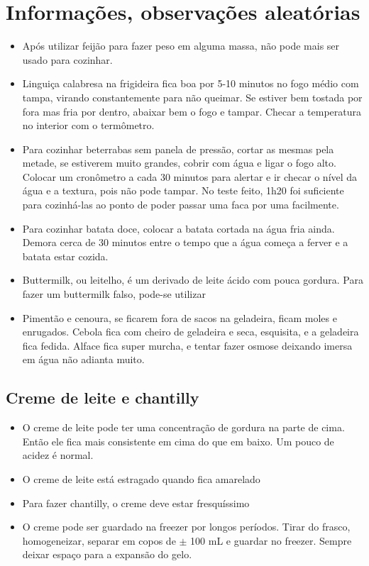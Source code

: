 \section{Informações, observações aleatórias}

\begin{itemize}
	\item Após utilizar feijão para fazer peso em alguma massa, não pode mais ser usado para cozinhar.
	\item Linguiça calabresa na frigideira fica boa por 5-10 minutos no fogo médio com tampa, virando
    constantemente para não queimar. Se estiver bem tostada por fora mas fria por dentro, abaixar bem o fogo e
    tampar. Checar a temperatura no interior com o termômetro.
  \item Para cozinhar beterrabas sem panela de pressão, cortar as mesmas pela metade, se estiverem muito
    grandes, cobrir com água e ligar o fogo alto. Colocar um cronômetro a cada 30 minutos para alertar e ir
    checar o nível da água e a textura, pois não pode tampar. No teste feito, 1h20 foi suficiente para
    cozinhá-las ao ponto de poder passar uma faca por uma facilmente.
  \item Para cozinhar batata doce, colocar a batata cortada na água fria ainda. Demora cerca de 30 minutos
    entre o tempo que a água começa a ferver e a batata estar cozida.
	\item Buttermilk, ou leitelho, é um derivado de leite ácido com pouca gordura. Para fazer um buttermilk
	      falso, pode-se utilizar
  \item Pimentão e cenoura, se ficarem fora de sacos na geladeira, ficam moles e enrugados. Cebola fica com
    cheiro de geladeira e seca, esquisita, e a geladeira fica fedida. Alface fica super murcha, e tentar fazer
    osmose deixando imersa em água não adianta muito.
\end{itemize}

\subsection*{Creme de leite e chantilly}
  \begin{itemize}
    \item O creme de leite pode ter uma concentração de gordura na parte de cima. Então ele fica mais
      consistente em cima do que em baixo. Um pouco de acidez é normal.
    \item O creme de leite está estragado quando fica amarelado
    \item Para fazer chantilly, o creme deve estar fresquíssimo
    \item O creme pode ser guardado na freezer por longos períodos. Tirar do frasco, homogeneizar, separar em
      copos de $\pm$ 100 mL e guardar no freezer. Sempre deixar espaço para a expansão do gelo.
  \end{itemize}

